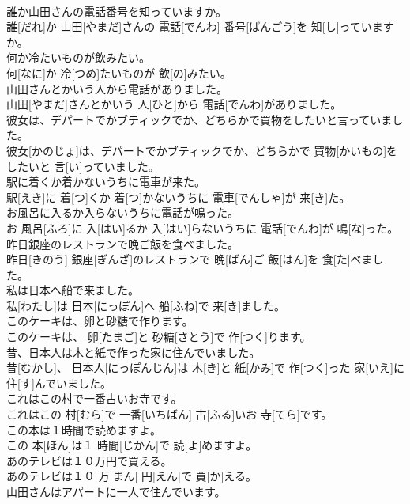 \documentclass[8pt]{extreport}
\begin{document}
\begin{CJK}{UTF8}{min}
\\	誰か山田さんの電話番号を知っていますか。	
\\	誰[だれ]か 山田[やまだ]さんの 電話[でんわ] 番号[ばんごう]を 知[し]っていますか。	
\\	何か冷たいものが飲みたい。	
\\	何[なに]か 冷[つめ]たいものが 飲[の]みたい。	
\\	山田さんとかいう人から電話がありました。	
\\	山田[やまだ]さんとかいう 人[ひと]から 電話[でんわ]がありました。	
\\	彼女は、デパートでかブティックでか、どちらかで買物をしたいと言っていました。	
\\	彼女[かのじょ]は、デパートでかブティックでか、どちらかで 買物[かいもの]をしたいと 言[い]っていました。	
\\	駅に着くか着かないうちに電車が来た。	
\\	駅[えき]に 着[つ]くか 着[つ]かないうちに 電車[でんしゃ]が 来[き]た。	
\\	お風呂に入るか入らないうちに電話が鳴った。	
\\	お 風呂[ふろ]に 入[はい]るか 入[はい]らないうちに 電話[でんわ]が 鳴[な]った。	
\\	昨日銀座のレストランで晩ご飯を食べました。	
\\	昨日[きのう] 銀座[ぎんざ]のレストランで 晩[ばん]ご 飯[はん]を 食[た]べました。	
\\	私は日本へ船で来ました。	
\\	私[わたし]は 日本[にっぽん]へ 船[ふね]で 来[き]ました。	
\\	このケーキは、卵と砂糖で作ります。	
\\	このケーキは、 卵[たまご]と 砂糖[さとう]で 作[つく]ります。	
\\	昔、日本人は木と紙で作った家に住んでいました。	
\\	昔[むかし]、 日本人[にっぽんじん]は 木[き]と 紙[かみ]で 作[つく]った 家[いえ]に 住[す]んでいました。	
\\	これはこの村で一番古いお寺です。	
\\	これはこの 村[むら]で 一番[いちばん] 古[ふる]いお 寺[てら]です。	
\\	この本は１時間で読めますよ。	
\\	この 本[ほん]は１ 時間[じかん]で 読[よ]めますよ。	
\\	あのテレビは１０万円で買える。	
\\	あのテレビは１０ 万[まん] 円[えん]で 買[か]える。	
\\	山田さんはアパートに一人で住んでいます。	

\end{CJK}
\end{document}
